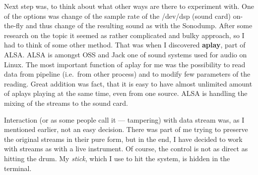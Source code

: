 \documentclass[12pt,a4paper,oneside]{report}
\begin{document}
Next step was, to think about what other ways are there to experiment with. One of the options was change of the sample rate of the /dev/dsp (sound card) on-the-fly and thus change of the resulting sound as with the Sonodump. After some research on the topic it seemed as rather complicated and bulky approach, so I had to think of some other method. That was when I discovered \textbf{aplay}, part of ALSA. ALSA is amongst OSS and Jack one of sound systems used for audio on Linux. The most important function of aplay for me was the possibility to read data from pipeline (i.e.\ from other process) and to modify few parameters of the reading. Great addition was fact, that it is easy to have almost unlimited amount of aplays playing at the same time, even from one source. ALSA is handling the mixing of the streams to the sound card.

Interaction (or as some people call it --- tampering) with data stream was, as I mentioned earlier, not an easy decision. There was part of me trying to preserve the original streams in their pure form, but in the end, I have decided to work with streams as with a live instrument. Of course, the control is not as direct as hitting the drum. My \emph{stick}, which I use to hit the system, is hidden in the terminal. 
\end{document}
